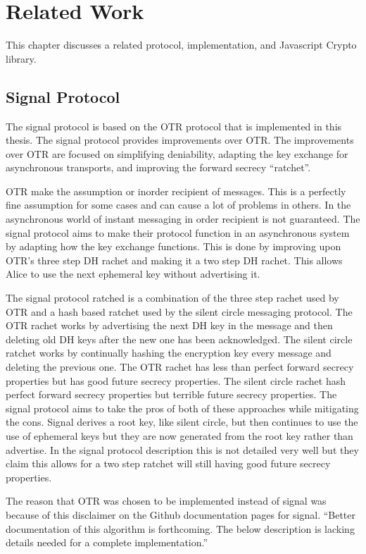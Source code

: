 \section{Related Work}


This chapter discusses a related protocol, implementation, and Javascript Crypto library.


\subsection{Signal Protocol} 


The signal protocol is based on the OTR protocol that is implemented in this thesis. The signal protocol provides improvements over OTR. The improvements over OTR are focused on simplifying deniability, adapting the key exchange for asynchronous transports, and improving the forward secrecy “ratchet”.


OTR make the assumption or inorder recipient of messages. This is a perfectly fine assumption for some cases and can cause a lot of problems in others. In the asynchronous world of instant messaging in order recipient is not guaranteed. The signal protocol aims to make their protocol function in an asynchronous system by adapting how the key exchange functions. This is done by improving upon OTR’s three step DH rachet and making it a two step DH rachet. This allows Alice to use the next ephemeral key without advertising it.


The signal protocol ratched is a combination of the three step rachet used by OTR and a hash based ratchet used by the silent circle messaging protocol. The OTR rachet works by advertising the next DH key in the message and then deleting old DH keys after the new one has been acknowledged. The silent circle ratchet works by continually hashing the encryption key every message and deleting the previous one. The OTR rachet has less than perfect forward secrecy properties but has good future secrecy properties. The silent circle rachet hash perfect forward secrecy properties but terrible future secrecy properties. The signal protocol aims to take the pros of both of these approaches while mitigating the cons. Signal derives a root key, like silent circle, but then continues to use the use of ephemeral keys but they are now generated from the root key rather than advertise. In the signal protocol description this is not detailed very well but they claim this allows for a two step ratchet will still having good future secrecy properties.
 
The reason that OTR was chosen to be implemented instead of signal was because of this disclaimer on the Github documentation pages for signal. “Better documentation of this algorithm is forthcoming. The below description is lacking details needed for a complete implementation.”


